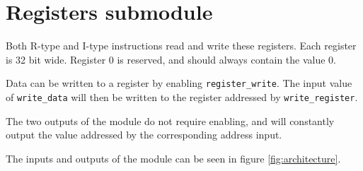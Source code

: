 \section{Registers submodule}
Both R-type and I-type instructions read and write these registers.
Each register is 32 bit wide.
Register 0 is reserved, and should always contain the value 0.

Data can be written to a register by enabling \texttt{register\_write}.
The input value of \texttt{write\_data} will then be written to the register addressed by \texttt{write\_register}.

The two outputs of the module do not require enabling,
and will constantly output the value addressed by the corresponding address input.

The inputs and outputs of the module can be seen in figure \ref{fig:architecture}.


